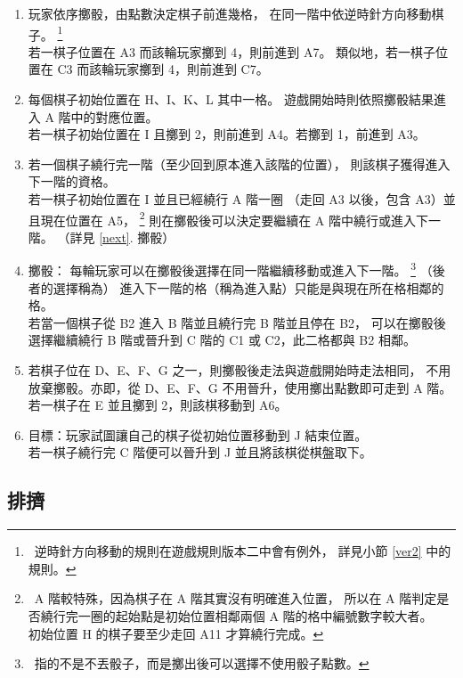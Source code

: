 \documentclass[11pt,a4paper]{article}
\begin{document}
\begin{enumerate}
	\item \label{clock}
		玩家依序擲骰，由點數決定棋子前進幾格，
		在同一階中依逆時針方向移動棋子。
			\footnote{\ 逆時針方向移動的規則在遊戲規則版本二中會有例外，
			詳見小節 \ref{ver2} 中的規則。}\\
		\zB 若一棋子位置在 A3 而該輪玩家擲到 4，則前進到 A7。
		類似地，若一棋子位置在 C3 而該輪玩家擲到 4，則前進到 C7。
	\item \label{initial}
		每個棋子初始位置在 H、I、K、L 其中一格。
		遊戲開始時則依照擲骰結果進入 A 階中的對應位置。\\
		\zB 若一棋子初始位置在 I 且擲到 2，則前進到 A4。若擲到 1，前進到 A3。
	\item \label{3}
		若一個棋子繞行完一階（至少回到原本進入該階的位置），
		則該棋子獲得進入下一階的資格。\\
		\zB 若一棋子初始位置在 I 並且已經繞行 A 階一圈
		（走回 A3 以後，包含 A3）並且現在位置在 A5，
			\footnote{\ A 階較特殊，因為棋子在 A 階其實沒有明確進入位置，
			所以在 A 階判定是否繞行完一圈的起始點是初始位置相鄰兩個 A 階的格中編號數字較大者。\\
			\zB 初始位置 H 的棋子要至少走回 A11 才算繞行完成。}
		則在擲骰後可以決定要繼續在 A 階中繞行或進入下一階。
		（詳見 \ref{next}.\! 擲骰）
	\item \label{next}
		\textsf{擲骰}：
		每輪玩家可以在擲骰後選擇在同一階繼續移動或進入下一階。
			\footnote{\ 指的不是不丟骰子，而是擲出後可以選擇不使用骰子點數。}
		（後者的選擇稱為）
		進入下一階的格（稱為進入點）只能是與現在所在格相鄰的格。\\
		\zB 若當一個棋子從 B2 進入 B 階並且繞行完 B 階並且停在 B2，
		可以在擲骰後選擇繼續繞行 B 階或晉升到 C 階的 C1 或 C2，此二格都與 B2 相鄰。
	\item
		若棋子位在 D、E、F、G 之一，則擲骰後走法與遊戲開始時走法相同，
		不用放棄擲骰。亦即，從 D、E、F、G 不用晉升，使用擲出點數即可走到 A 階。\\
		\zB 若一棋子在 E 並且擲到 2，則該棋移動到 A6。
	\item
		\textsf{目標}：玩家試圖讓自己的棋子從初始位置移動到 J 結束位置。\\
		\zB 若一棋子繞行完 C 階便可以晉升到 J 並且將該棋從棋盤取下。
\end{enumerate}

\subsection{排擠} \label{push} %
\end{document}

